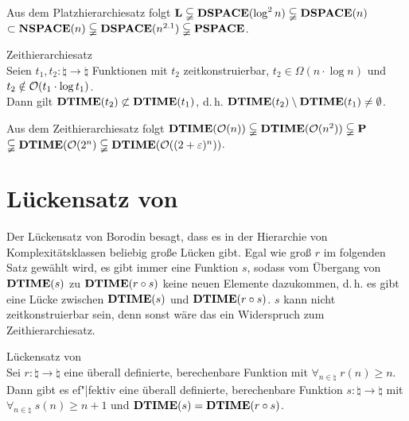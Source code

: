 \begin{Kor}
    Aus dem Platzhierarchiesatz folgt
    $\mathbf{L} \subsetneqq \mathbf{DSPACE}(\log^2 n) \subsetneqq \mathbf{DSPACE}(n)$\\
    $\subset \mathbf{NSPACE}(n) \subsetneqq \mathbf{DSPACE}(n^{2.1}) \subsetneqq \mathbf{PSPACE}$.
\end{Kor}

\linie

\begin{Satz}{Zeithierarchiesatz}\\
    Seien $t_1, t_2\colon \natural \rightarrow \natural$ Funktionen mit
    $t_2$ zeitkonstruierbar, $t_2 \in \Omega(n \cdot \log n)$ und
    $t_2 \notin \mathcal{O}(t_1 \cdot \log t_1)$.\\
    Dann gilt $\mathbf{DTIME}(t_2) \not\subset \mathbf{DTIME}(t_1)$, d.\,h.
    $\mathbf{DTIME}(t_2) \setminus \mathbf{DTIME}(t_1) \not= \emptyset$.
\end{Satz}

\begin{Kor}
    Aus dem Zeithierarchiesatz folgt
    $\mathbf{DTIME}(\mathcal{O}(n)) \subsetneqq \mathbf{DTIME}(\mathcal{O}(n^2)) \subsetneqq \mathbf{P}$\\
    $\subsetneqq \mathbf{DTIME}(\mathcal{O}(2^n) \subsetneqq \mathbf{DTIME}(\mathcal{O}((2 + \varepsilon)^n))$.
\end{Kor}

\pagebreak

\section{%
    Lückensatz von %
}

\begin{Bem}
    Der Lückensatz von Borodin besagt, dass es in der Hierarchie von Komplexitätsklassen
    beliebig große Lücken gibt.
    Egal wie groß $r$ im folgenden Satz gewählt wird, es gibt immer eine Funktion $s$,
    sodass vom Übergang von $\mathbf{DTIME}(s)$ zu $\mathbf{DTIME}(r \circ s)$ keine neuen Elemente dazukommen,
    d.\,h. es gibt eine Lücke zwischen $\mathbf{DTIME}(s)$ und $\mathbf{DTIME}(r \circ s)$.
    $s$ kann nicht zeitkonstruierbar sein, denn sonst wäre das ein Widerspruch
    zum Zeithierarchiesatz.
\end{Bem}

\linie

\begin{Satz}{Lückensatz von \upshape\,\!}\\
    Sei $r\colon \natural \rightarrow \natural$ eine überall definierte, berechenbare Funktion mit
    $\forall_{n \in \natural}\; r(n) \ge n$.\\
    Dann gibt es ef"|fektiv eine überall definierte, berechenbare Funktion
    $s\colon \natural \rightarrow \natural$ mit\\
    $\forall_{n \in \natural}\; s(n) \ge n + 1$ und $\mathbf{DTIME}(s) = \mathbf{DTIME}(r \circ s)$.
\end{Satz}

